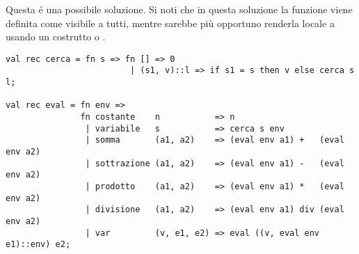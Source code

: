 Questa é una possibile soluzione. %
Si noti che in questa soluzione la funzione  viene definita come visibile a tutti, mentre sarebbe più opportuno renderla locale a  usando un costrutto  o .

\begin{lstlisting}[style = SML, caption = {Definizione della funzione \sml{eval}}]
val rec cerca = fn s => fn [] => 0
						 | (s1, v)::l => if s1 = s then v else cerca s l;

val rec eval = fn env =>
			   fn costante    n           => n
				| variabile   s           => cerca s env
				| somma       (a1, a2)    => (eval env a1) +   (eval env a2)
				| sottrazione (a1, a2)    => (eval env a1) -   (eval env a2)
				| prodotto    (a1, a2)    => (eval env a1) *   (eval env a2)
				| divisione   (a1, a2)    => (eval env a1) div (eval env a2)
				| var         (v, e1, e2) => eval ((v, eval env e1)::env) e2;
\end{lstlisting}
